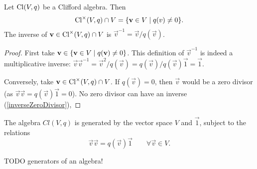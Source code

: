 \begin{lemma} \label{vectorInverseCliffordAlgebra}
Let $\operatorname{Cl}(V,q)$ be a Clifford algebra. Then
\[ \Cl^\times(V,q) \cap V = \setbuilder{\vec{v}\in V}{q(v) \neq 0}. \]
The inverse of $\boldsymbol{\mathrm{v}}\in \operatorname{Cl}^\times(V,q) \cap V$ is $\vec{v}^{-1} = \vec{v}/q(\vec{v})$.
\end{lemma}
\begin{proof}
First take $\vec{v}\in \setbuilder{\vec{v}\in V}{q(\vec{v}) \neq 0}$. This definition of $\vec{v}^{-1}$ is indeed a multiplicative inverse: $\vec{v}\vec{v}^{-1} = \vec{v}^2/q(\vec{v}) = q(\vec{v})/q(\vec{v})\vec{1} = \vec{1}$.

Conversely, take $\boldsymbol{\mathrm{v}}\in \operatorname{Cl}^\times(V,q) \cap V$. If $q(\vec{v}) = 0$, then $\vec{v}$ would be a zero divisor (as $\vec{v}\vec{v} = q(\vec{v})\vec{1} = 0$). No zero divisor can have an inverse (\ref{inverseZeroDivisor}), 
\end{proof}

\begin{lemma} \label{CliffordRelation}
The algebra $Cl(V,q)$ is generated by the vector space $V$ and $\vec{1}$, subject to the relations
\[ \vec{v}\vec{v} = q(\vec{v})\vec{1} \qquad \forall \vec{v}\in V. \]
\end{lemma}
TODO generators of an algebra!


